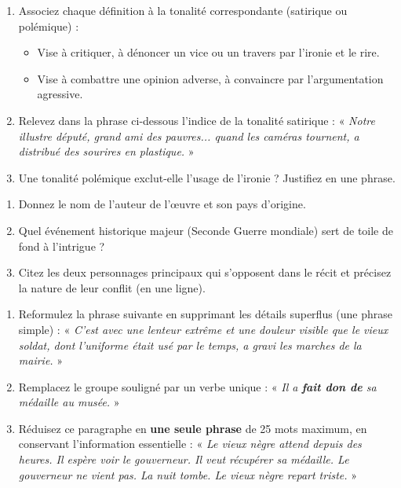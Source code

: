 \documentclass[11pt]{article}
\begin{document}
\begin{exercice}
\begin{enumerate}
    \item Associez chaque définition à la tonalité correspondante (satirique ou polémique) :
    \begin{itemize}
        \item[A.] Vise à critiquer, à dénoncer un vice ou un travers par l'ironie et le rire.
        \item[B.] Vise à combattre une opinion adverse, à convaincre par l'argumentation agressive.
    \end{itemize}
    \item Relevez dans la phrase ci-dessous l'indice de la tonalité satirique : « \textit{Notre illustre député, grand ami des pauvres... quand les caméras tournent, a distribué des sourires en plastique.} »
    \item Une tonalité polémique exclut-elle l'usage de l'ironie ? Justifiez en une phrase.
\end{enumerate}
\end{exercice}

\begin{exercice}
\begin{enumerate}
    \item Donnez le nom de l'auteur de l'œuvre et son pays d'origine.
    \item Quel événement historique majeur (Seconde Guerre mondiale) sert de toile de fond à l'intrigue ?
    \item Citez les deux personnages principaux qui s'opposent dans le récit et précisez la nature de leur conflit (en une ligne).
\end{enumerate}
\end{exercice}

\begin{exercice}
\begin{enumerate}
    \item Reformulez la phrase suivante en supprimant les détails superflus (une phrase simple) :
    « \textit{C'est avec une lenteur extrême et une douleur visible que le vieux soldat, dont l'uniforme était usé par le temps, a gravi les marches de la mairie.} »
    \item Remplacez le groupe souligné par un verbe unique : « \textit{Il a \textbf{fait don de} sa médaille au musée.} »
    \item Réduisez ce paragraphe en \textbf{une seule phrase} de 25 mots maximum, en conservant l'information essentielle :
    « \textit{Le vieux nègre attend depuis des heures. Il espère voir le gouverneur. Il veut récupérer sa médaille. Le gouverneur ne vient pas. La nuit tombe. Le vieux nègre repart triste.} »
\end{enumerate}
\end{exercice}
\end{document}
